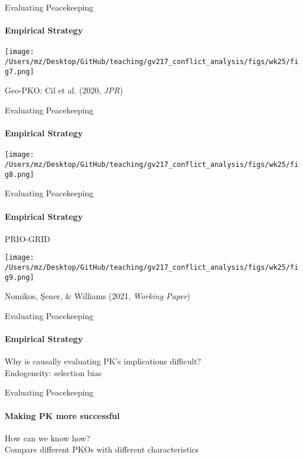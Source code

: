 \documentclass{beamer}
\begin{document}
\begin{frame}{Evaluating Peacekeeping}
\framesubtitle{Empirical Strategy}
\pause
\begin{center}
    \texttt{[image: /Users/mz/Desktop/GitHub/teaching/gv217\_conflict\_analysis/figs/wk25/fig7.png]}
\end{center}
\tiny Geo-PKO: Cil et al. (2020, \textit{JPR})
\end{frame}

\begin{frame}{Evaluating Peacekeeping}
\framesubtitle{Empirical Strategy}
\pause
\begin{center}
    \texttt{[image: /Users/mz/Desktop/GitHub/teaching/gv217\_conflict\_analysis/figs/wk25/fig8.png]}
\end{center}
\end{frame}

\begin{frame}{Evaluating Peacekeeping}
\framesubtitle{Empirical Strategy}
\pause PRIO-GRID
\pause
\begin{center}
    \texttt{[image: /Users/mz/Desktop/GitHub/teaching/gv217\_conflict\_analysis/figs/wk25/fig9.png]}
\end{center}
\tiny Nomikos, Şener, \& Williams (2021, \textit{Working Paper})
\end{frame}    

\begin{frame}{Evaluating Peacekeeping}
\framesubtitle{Empirical Strategy}
    \pause Why is causally evaluating PK's implications difficult?\\
    \pause Endogeneity: selection bias
\end{frame}

\begin{frame}{Evaluating Peacekeeping}
\framesubtitle{Making PK more successful}
    \pause How can we know how?\\
    \pause Compare different PKOs with different characteristics
\end{frame}
\end{document}

